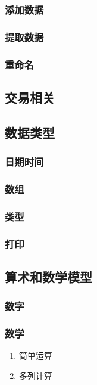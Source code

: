 \documentclass[11pt]{article}
\begin{document}
\subsubsection{添加数据}
\label{sec:orgheadline75}
\subsubsection{提取数据}
\label{sec:orgheadline76}
\subsubsection{重命名}
\label{sec:orgheadline77}
\subsection{交易相关}
\label{sec:orgheadline79}
\subsection{数据类型}
\label{sec:orgheadline84}

\subsubsection{日期时间}
\label{sec:orgheadline80}

\subsubsection{数组}
\label{sec:orgheadline81}

\subsubsection{类型}
\label{sec:orgheadline82}

\subsubsection{打印}
\label{sec:orgheadline83}

\subsection{算术和数学模型}
\label{sec:orgheadline111}

\subsubsection{数字}
\label{sec:orgheadline85}

\subsubsection{数学}
\label{sec:orgheadline88}
\begin{enumerate}
\item 简单运算
\label{sec:orgheadline86}
\item 多列计算
\label{sec:orgheadline87}
\end{enumerate}
\end{document}
